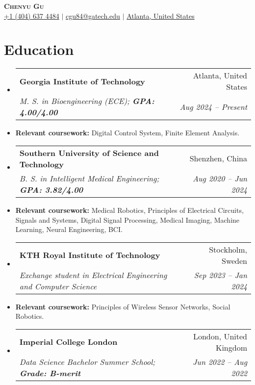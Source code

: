 \documentclass[letterpaper,11pt]{article}
\makeatletter
\newcommand{\resumeItem}[1]{
  \item\small{
    {#1 \vspace{-2pt}}
  }
}
\newcommand{\resumeSubheading}[4]{
  \vspace{-2pt}\item
    \begin{tabular*}{0.97\textwidth}[t]{l@{\extracolsep{\fill}}r}
      \textbf{#1} & #2 \\
      \textit{\small#3} & \textit{\small #4} \\
    \end{tabular*}\vspace{-7pt}
}
\newcommand{\resumeSubHeadingListStart}{\begin{itemize}[leftmargin=0.15in, label={}]}
\newcommand{\resumeSubHeadingListEnd}{\end{itemize}}
\makeatother
\begin{document}
\begin{center}
  \textbf{\Huge \scshape Chenyu Gu} \\ \vspace{3pt}
  \small
  \faMobile \hspace{.5pt} \href{tel:14046374484}{+1 (404) 637 4484}
  $|$
  \faAt \hspace{.5pt} \href{mailto:cgu84@gatech.edu}{cgu84@gatech.edu}
  $|$
  \faMapMarker \hspace{.5pt} \href{https://www.google.com/maps/place/Georgia+Institute+of+Technology/@33.7756222,-84.3988599,16z/data=!3m1!4b1}{Atlanta, United States}
\end{center}

\section{Education}
\vspace{3pt}
\resumeSubHeadingListStart

\resumeSubheading
{Georgia Institute of Technology}{Atlanta, United States}
{M.
  S.
  in Bioengineering (ECE); \textbf{GPA: 4.00/4.00}}{Aug 2024 -- Present}
\resumeItem{\small \textbf{Relevant coursework:}
  Digital Control System, Finite Element Analysis.
}

\resumeSubheading
{Southern University of Science and Technology}{Shenzhen, China}
{B.
  S.
  in Intelligent Medical Engineering; \textbf{GPA: 3.82/4.00}}{Aug 2020 -- Jun 2024}
\resumeItem{\small \textbf{Relevant coursework:}
  Medical Robotics, Principles of Electrical Circuits, Signals and Systems, Digital Signal
  Processing, Medical Imaging, Machine Learning, Neural Engineering, BCI.
}

\resumeSubheading
{KTH Royal Institute of Technology}{Stockholm, Sweden}
{Exchange student in Electrical Engineering and Computer Science}{Sep 2023 -- Jan 2024}
\resumeItem{\small \textbf{Relevant coursework:}
  Principles of Wireless Sensor Networks, Social Robotics.
}

\resumeSubheading
{Imperial College London}{London, United Kingdom}
{Data Science Bachelor Summer School; \textbf{Grade: B-merit}}{Jun 2022 -- Aug 2022}

\resumeSubHeadingListEnd
\end{document}
